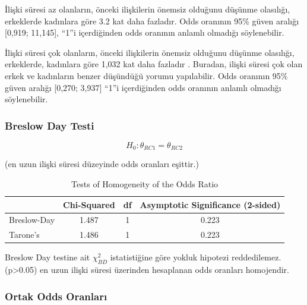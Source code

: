 \documentclass{article}
\begin{document}
\vspace{10pt}
İlişki süresi az olanların, önceki ilişkilerin önemsiz olduğunu düşünme olasılığı, erkeklerde kadınlara göre 3.2 kat daha fazladır. Odds oranının 95\% güven aralığı [0,919;  11,145], “1”i içerdiğinden odds oranının anlamlı olmadığı söylenebilir.

\vspace{10pt}
İlişki süresi çok olanların, önceki ilişkilerin önemsiz olduğunu düşünme olasılığı, erkeklerde, kadınlara göre 1,032 kat daha fazladır . Buradan, ilişki süresi çok olan erkek ve kadınların benzer düşündüğü yorumu yapılabilir. Odds oranının 95\% güven aralığı [0,270;  3,937] “1”i içerdiğinden odds oranının anlamlı olmadığı söylenebilir.

\subsubsection{Breslow Day Testi}

\vspace{50pt}

$$H_0: \theta_{RC1} = \theta_{RC2} $$  

\begin{center}
(en uzun ilişki süresi düzeyinde odds oranları eşittir.)
\end{center}
\vspace{20pt}
\begin{table}[htbp]
\centering
\caption{Tests of Homogeneity of the Odds Ratio}
\label{tab:homogeneity-tests}
\begin{tabular}{lccc}
\hline
 & \textbf{Chi-Squared} & \textbf{df} & \textbf{Asymptotic Significance (2-sided)} \\
\hline
Breslow-Day & 1.487 & 1 & 0.223 \\
Tarone's & 1.486 & 1 & 0.223 \\
\hline
\end{tabular}
\end{table}





\vspace{10pt}
Breslow Day testine ait $\chi^2_{BD}$ istatistiğine göre yokluk hipotezi reddedilemez. (p>0.05) en uzun ilişki süresi üzerinden hesaplanan odds oranları homojendir. 

\subsubsection{Ortak Odds Oranları}
\end{document}
